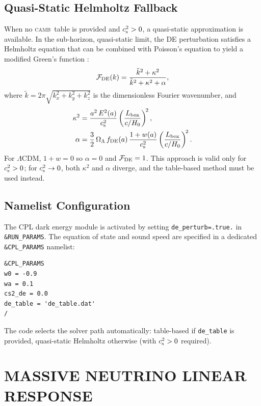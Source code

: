 \documentclass[fleqn,usenatbib]{mnras}
\newcommand{\camb}{\textsc{camb}}
\newcommand{\code}[1]{\texttt{#1}}
\newcommand{\Ol}{\Omega_\Lambda}
\newcommand{\cst}{c_{\rm s}^2}
\begin{document}
\subsection{Quasi-Static Helmholtz Fallback}
\label{sec:de_helmholtz}

When no \camb\ table is provided and $\cst > 0$, a quasi-static
approximation is available.  In the sub-horizon, quasi-static limit,
the DE perturbation satisfies a Helmholtz equation that can be
combined with Poisson's equation to yield a modified Green's function
\citep{Bean2004,Sapone2010}:
\begin{equation}
\mathcal{F}_{\rm DE}(k)
  = \frac{\tilde{k}^2 + \kappa^2}
         {\tilde{k}^2 + \kappa^2 + \alpha},
\label{eq:helmholtz_factor}
\end{equation}
where $\tilde{k} = 2\pi\sqrt{k_x^2+k_y^2+k_z^2}$ is the
dimensionless Fourier wavenumber, and
\begin{align}
\kappa^2 &= \frac{a^2\,E^2(a)}{c_{\rm s}^2}
  \left(\frac{L_{\rm box}}{c/H_0}\right)^{\!2},
\label{eq:kappa2}\\
\alpha &= \frac{3}{2}\,\Ol\,f_{\rm DE}(a)\,
  \frac{1+w(a)}{c_{\rm s}^2}
  \left(\frac{L_{\rm box}}{c/H_0}\right)^{\!2}.
\label{eq:alpha}
\end{align}
For $\Lambda$CDM, $1+w=0$ so $\alpha=0$ and $\mathcal{F}_{\rm DE}=1$.
This approach is valid only for $\cst > 0$; for $\cst \to 0$, both
$\kappa^2$ and $\alpha$ diverge, and the table-based method must be
used instead.

\subsection{Namelist Configuration}
\label{sec:de_namelist}

The CPL dark energy module is activated by setting \code{de\_perturb=.true.}
in \code{\&RUN\_PARAMS}.  The equation of state and sound speed are
specified in a dedicated \code{\&CPL\_PARAMS} namelist:
\begin{verbatim}
&CPL_PARAMS
w0 = -0.9
wa = 0.1
cs2_de = 0.0
de_table = 'de_table.dat'
/
\end{verbatim}
The code selects the solver path automatically: table-based if
\code{de\_table} is provided, quasi-static Helmholtz otherwise
(with $\cst > 0$ required).


\section{MASSIVE NEUTRINO LINEAR RESPONSE}
\label{sec:neutrino}
\end{document}
